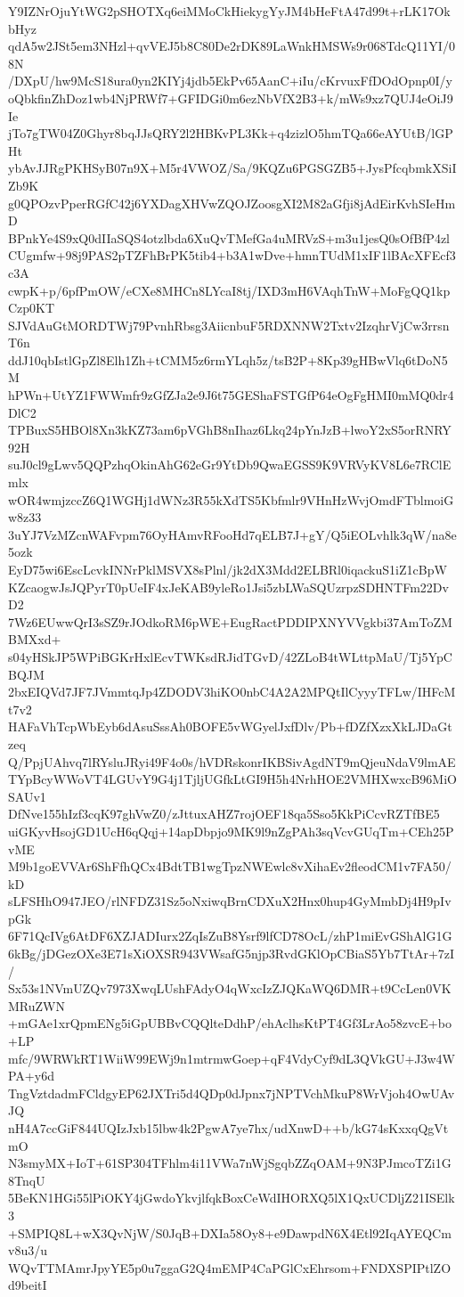 Y9IZNrOjuYtWG2pSHOTXq6eiMMoCkHiekygYyJM4bHeFtA47d99t+rLK17OkbHyz
qdA5w2JSt5em3NHzl+qvVEJ5b8C80De2rDK89LaWnkHMSWs9r068TdcQ11YI/08N
/DXpU/hw9McS18ura0yn2KIYj4jdb5EkPv65AanC+iIu/cKrvuxFfDOdOpnp0I/y
oQbkfinZhDoz1wb4NjPRWf7+GFIDGi0m6ezNbVfX2B3+k/mWs9xz7QUJ4eOiJ9Ie
jTo7gTW04Z0Ghyr8bqJJsQRY2l2HBKvPL3Kk+q4zizlO5hmTQa66eAYUtB/lGPHt
ybAvJJRgPKHSyB07n9X+M5r4VWOZ/Sa/9KQZu6PGSGZB5+JysPfcqbmkXSiIZb9K
g0QPOzvPperRGfC42j6YXDagXHVwZQOJZoosgXI2M82aGfji8jAdEirKvhSIeHmD
BPnkYe4S9xQ0dIIaSQS4otzlbda6XuQvTMefGa4uMRVzS+m3u1jesQ0sOfBfP4zl
CUgmfw+98j9PAS2pTZFhBrPK5tib4+b3A1wDve+hmnTUdM1xIF1lBAcXFEcf3c3A
cwpK+p/6pfPmOW/eCXe8MHCn8LYcaI8tj/IXD3mH6VAqhTnW+MoFgQQ1kpCzp0KT
SJVdAuGtMORDTWj79PvnhRbsg3AiicnbuF5RDXNNW2Txtv2IzqhrVjCw3rrsnT6n
ddJ10qbIstlGpZl8Elh1Zh+tCMM5z6rmYLqh5z/tsB2P+8Kp39gHBwVlq6tDoN5M
hPWn+UtYZ1FWWmfr9zGfZJa2e9J6t75GEShaFSTGfP64eOgFgHMI0mMQ0dr4DlC2
TPBuxS5HBOl8Xn3kKZ73am6pVGhB8nIhaz6Lkq24pYnJzB+lwoY2xS5orRNRY92H
suJ0cl9gLwv5QQPzhqOkinAhG62eGr9YtDb9QwaEGSS9K9VRVyKV8L6e7RClEmlx
wOR4wmjzccZ6Q1WGHj1dWNz3R55kXdTS5Kbfmlr9VHnHzWvjOmdFTblmoiGw8z33
3uYJ7VzMZcnWAFvpm76OyHAmvRFooHd7qELB7J+gY/Q5iEOLvhlk3qW/na8e5ozk
EyD75wi6EscLcvkINNrPklMSVX8sPlnl/jk2dX3Mdd2ELBRl0iqackuS1iZ1cBpW
KZcaogwJsJQPyrT0pUeIF4xJeKAB9yleRo1Jsi5zbLWaSQUzrpzSDHNTFm22DvD2
7Wz6EUwwQrI3sSZ9rJOdkoRM6pWE+EugRactPDDIPXNYVVgkbi37AmToZMBMXxd+
s04yHSkJP5WPiBGKrHxlEcvTWKsdRJidTGvD/42ZLoB4tWLttpMaU/Tj5YpCBQJM
2bxEIQVd7JF7JVmmtqJp4ZDODV3hiKO0nbC4A2A2MPQtIlCyyyTFLw/IHFcMt7v2
HAFaVhTcpWbEyb6dAsuSssAh0BOFE5vWGyelJxfDlv/Pb+fDZfXzxXkLJDaGtzeq
Q/PpjUAhvq7lRYsluJRyi49F4o0s/hVDRskonrIKBSivAgdNT9mQjeuNdaV9lmAE
TYpBcyWWoVT4LGUvY9G4j1TjljUGfkLtGI9H5h4NrhHOE2VMHXwxcB96MiOSAUv1
DfNve155hIzf3cqK97ghVwZ0/zJttuxAHZ7rojOEF18qa5Sso5KkPiCcvRZTfBE5
uiGKyvHsojGD1UcH6qQqj+14apDbpjo9MK9l9nZgPAh3sqVcvGUqTm+CEh25PvME
M9b1goEVVAr6ShFfhQCx4BdtTB1wgTpzNWEwlc8vXihaEv2fleodCM1v7FA50/kD
sLFSHhO947JEO/rlNFDZ31Sz5oNxiwqBrnCDXuX2Hnx0hup4GyMmbDj4H9pIvpGk
6F71QcIVg6AtDF6XZJADIurx2ZqIsZuB8Ysrf9lfCD78OcL/zhP1miEvGShAlG1G
6kBg/jDGezOXe3E71sXiOXSR943VWsafG5njp3RvdGKlOpCBiaS5Yb7TtAr+7zI/
Sx53s1NVmUZQv7973XwqLUshFAdyO4qWxcIzZJQKaWQ6DMR+t9CcLen0VKMRuZWN
+mGAe1xrQpmENg5iGpUBBvCQQlteDdhP/ehAclhsKtPT4Gf3LrAo58zvcE+bo+LP
mfc/9WRWkRT1WiiW99EWj9n1mtrmwGoep+qF4VdyCyf9dL3QVkGU+J3w4WPA+y6d
TngVztdadmFCldgyEP62JXTri5d4QDp0dJpnx7jNPTVchMkuP8WrVjoh4OwUAvJQ
nH4A7ccGiF844UQIzJxb15lbw4k2PgwA7ye7hx/udXnwD++b/kG74sKxxqQgVtmO
N3smyMX+IoT+61SP304TFhlm4i11VWa7nWjSgqbZZqOAM+9N3PJmcoTZi1G8TnqU
5BeKN1HGi55lPiOKY4jGwdoYkvjlfqkBoxCeWdIHORXQ5lX1QxUCDljZ21ISElk3
+SMPIQ8L+wX3QvNjW/S0JqB+DXIa58Oy8+e9DawpdN6X4Etl92IqAYEQCmv8u3/u
WQvTTMAmrJpyYE5p0u7ggaG2Q4mEMP4CaPGlCxEhrsom+FNDXSPIPtlZOd9beitI
